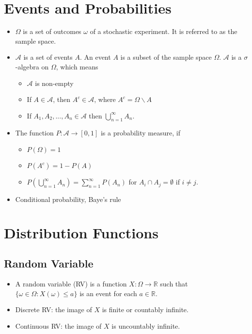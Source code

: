 \documentclass[a4paper,12pt]{article}
\begin{document}
\section{Events and Probabilities}
\begin{itemize}
\item $\Omega$ is a set of outcomes $\omega$ of a stochastic experiment. It is referred to as the sample space.
\item $\mathcal{A}$ is a set of events $A$. An event $A$ is a subset of the sample space $\Omega$. $\mathcal{A}$ is a $\sigma$-algebra on $\Omega$, which means
\begin{itemize}
\item $\mathcal{A}$ is non-empty
\item If $A \in \mathcal{A}$, then $A^c \in \mathcal{A}$, where $A^c = \Omega \backslash A$
\item If $A_1, A_2, ..., A_n \in \mathcal{A}$ then $\bigcup_{n=1}^{\infty}A_n$.
\end{itemize}  
\item The function $P: \mathcal{A} \to [0,1]$ is a probability measure, if
\begin{itemize}
\item $P(\Omega) = 1$
\item $P(A^c) = 1 - P(A)$
\item $P \left ( \bigcup_{n=1}^\infty A_n \right ) = \sum_{n=1}^\infty P(A_n)$ for $A_i \cap A_j = \emptyset$ if $i \ne j$.
\end{itemize}
\item Conditional probability, Baye's rule
\end{itemize}
\section{Distribution Functions}
\subsection{Random Variable}
\begin{itemize}
\item A random variable (RV) is a function $X:\Omega \to \mathbb{R}$ such that $\{ \omega \in \Omega : X(\omega) \le a \}$ is an event for each $a \in \mathbb{R}$. 
\item Discrete RV: the image of $X$ is finite or countably infinite.
\item Continuous RV: the image of $X$ is uncountably infinite.
\end{itemize}
\end{document}

